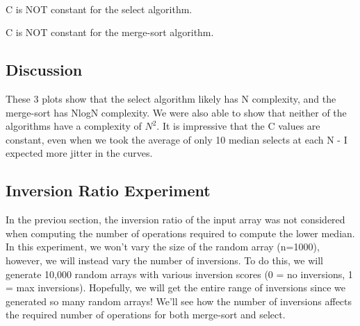\documentclass[11pt]{article}
\begin{document}
    \begin{center}
    \end{center}
    { \hspace*{\fill} \\}
    
    C is NOT constant for the select algorithm.

C is NOT constant for the merge-sort algorithm.

    \subsection{Discussion}\label{discussion}

These 3 plots show that the select algorithm likely has N complexity,
and the merge-sort has NlogN complexity. We were also able to show that
neither of the algorithms have a complexity of \(N^2\). It is impressive
that the C values are constant, even when we took the average of only 10
median selects at each N - I expected more jitter in the curves.

    \subsection{Inversion Ratio
Experiment}\label{inversion-ratio-experiment}

In the previou section, the inversion ratio of the input array was not
considered when computing the number of operations required to compute
the lower median. In this experiment, we won't vary the size of the
random array (n=1000), however, we will instead vary the number of
inversions. To do this, we will generate 10,000 random arrays with
various inversion scores (0 = no inversions, 1 = max inversions).
Hopefully, we will get the entire range of inversions since we generated
so many random arrays! We'll see how the number of inversions affects
the required number of operations for both merge-sort and select.
\end{document}
